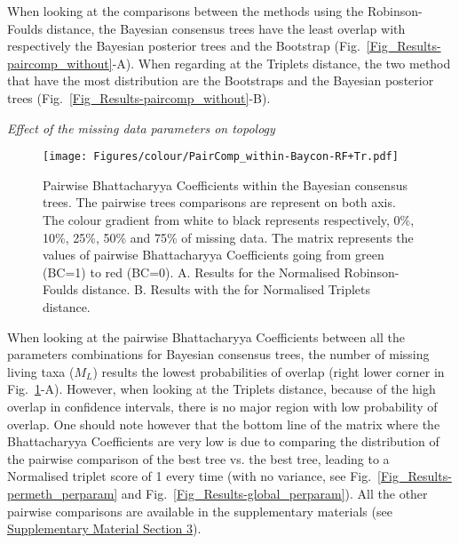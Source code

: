 \documentclass[12pt,letterpaper]{article}
\renewcommand{\subsection}[1]{%
\bigskip
\begin{center}
\begin{large}
\normalfont\itshape #1
\end{large}
\end{center}}
\begin{document}
When looking at the comparisons between the methods using the Robinson-Foulds distance, the Bayesian consensus trees have the least overlap with respectively the Bayesian posterior trees and the Bootstrap (Fig.~\ref{Fig_Results-paircomp_without}-A). When regarding at the Triplets distance, the two method that have the most distribution are the Bootstraps and the Bayesian posterior trees (Fig.~\ref{Fig_Results-paircomp_without}-B).

\subsection{Effect of the missing data parameters on topology}

\begin{figure} 
\centering
    \texttt{[image: Figures/colour/PairComp\_within-Baycon-RF+Tr.pdf]}
\caption{Pairwise Bhattacharyya Coefficients within the Bayesian consensus trees. The pairwise trees comparisons are represent on both axis. The colour gradient from white to black represents respectively, 0\%, 10\%, 25\%, 50\% and 75\% of missing data. The matrix represents the values of pairwise Bhattacharyya Coefficients going from green (BC=1) to red (BC=0). A. Results for the Normalised Robinson-Foulds distance. B. Results with the for Normalised Triplets distance.}
\label{Fig_Results-paircomp_within}
\end{figure} %

When looking at the pairwise Bhattacharyya Coefficients between all the parameters combinations for Bayesian consensus trees, the number of missing living taxa ($M_{L}$) results the lowest probabilities of overlap (right lower corner in Fig.~\ref{Fig_Results-paircomp_within}-A). However, when looking at the Triplets distance, because of the high overlap in confidence intervals, there is no major region with low probability of overlap. One should note however that the bottom line of the matrix where the Bhattacharyya Coefficients are very low is due to comparing the distribution of the pairwise comparison of the best tree vs. the best tree, leading to a Normalised triplet score of 1 every time (with no variance, see Fig.~\ref{Fig_Results-permeth_perparam} and Fig.~\ref{Fig_Results-global_perparam}). All the other pairwise comparisons are available in the supplementary materials (see \hyperref[SupplementaryMaterial]{Supplementary Material Section 3}).

%
%
\end{document}
